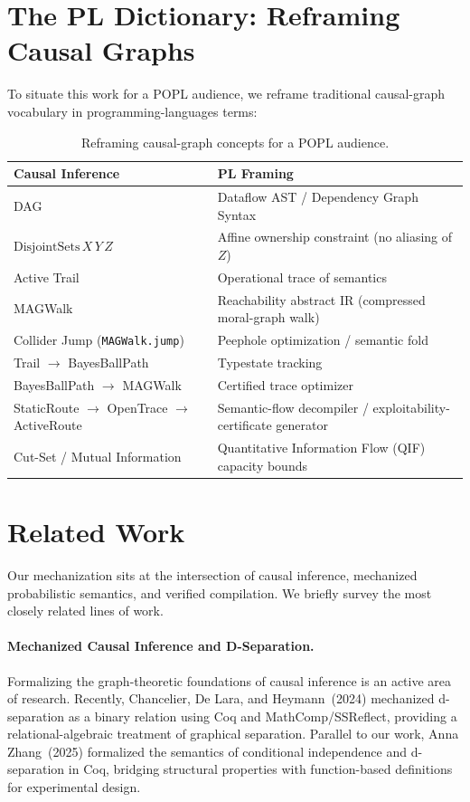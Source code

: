 \documentclass[acmsmall,screen,nonacm]{acmart}
\newcommand{\lean}[1]{\lstinline!#1!}
\begin{document}
\section{The PL Dictionary: Reframing Causal Graphs}\label{sec:dictionary}

To situate this work for a POPL audience, we reframe traditional causal-graph
vocabulary in programming-languages terms:

\begin{table}[ht]
\centering
\small
\begin{tabular}{ll}
\toprule
\textbf{Causal Inference} & \textbf{PL Framing} \\
\midrule
DAG & Dataflow AST / Dependency Graph Syntax \\
$\text{DisjointSets}\,X\,Y\,Z$ & Affine ownership constraint (no aliasing of $Z$) \\
Active Trail & Operational trace of semantics \\
MAGWalk & Reachability abstract IR (compressed moral-graph walk) \\
Collider Jump (\lean{MAGWalk.jump}) & Peephole optimization / semantic fold \\
Trail $\to$ BayesBallPath & Typestate tracking \\
BayesBallPath $\to$ MAGWalk & Certified trace optimizer \\
StaticRoute $\to$ OpenTrace $\to$ ActiveRoute & Semantic-flow decompiler / exploitability-certificate generator \\
Cut-Set / Mutual Information & Quantitative Information Flow (QIF) capacity bounds \\
\bottomrule
\end{tabular}
\caption{Reframing causal-graph concepts for a POPL audience.}
\label{tab:dictionary}
\end{table}

\section{Related Work}
\label{sec:related}

Our mechanization sits at the intersection of causal inference, mechanized probabilistic semantics, and verified compilation. We briefly survey the most closely related lines of work.

\paragraph{Mechanized Causal Inference and D-Separation.}
Formalizing the graph-theoretic foundations of causal inference is an active area of research. Recently, Chancelier, De Lara, and Heymann~(2024) \cite{chancelier2024conditional} mechanized d-separation as a binary relation using Coq and MathComp/SSReflect, providing a relational-algebraic treatment of graphical separation. Parallel to our work, Anna Zhang~(2025) \cite{coqci2025} formalized the semantics of conditional independence and d-separation in Coq, bridging structural properties with function-based definitions for experimental design.
\end{document}
